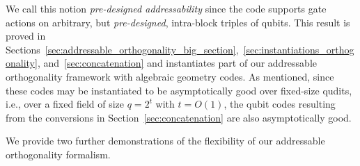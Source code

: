 \documentclass[11pt]{article}
\theoremstyle{definition}
\begin{document}
    We call this notion \emph{pre-designed addressability} since the code supports gate actions on arbitrary, but {\em pre-designed}, intra-block triples of qubits. This result is proved in Sections~\ref{sec:addressable_orthogonality_big_section},~\ref{sec:instantiations_orthogonality}, and~\ref{sec:concatenation} and instantiates part of our addressable orthogonality framework with algebraic geometry codes. As mentioned, since these codes may be instantiated to be asymptotically good over fixed-size qudits, i.e., over a fixed field of size $q=2^t$ with $t=O(1)$, the qubit codes resulting from the conversions in Section~\ref{sec:concatenation} are also asymptotically good.

    We provide two further demonstrations of the  flexibility of our addressable orthogonality formalism. 
    
\end{document}
